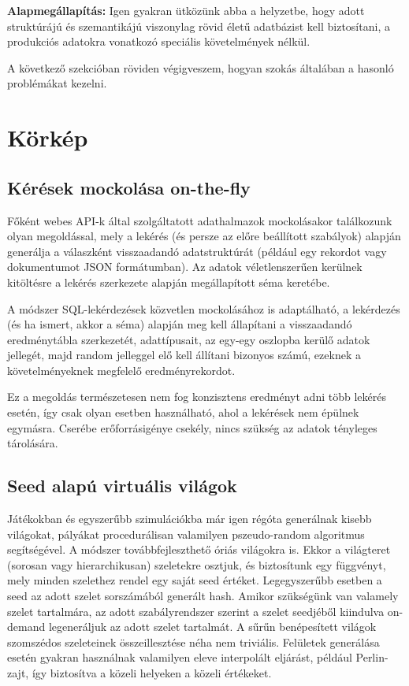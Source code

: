 \documentclass[
    parspace,
    noindent,
    nohyp,
]{elteiktdk}[2023/04/10]
\newcommand{\thesispar}[1]{
\vspace{1em}
\hspace{0.7cm}\parbox[left][][c]{15.8cm}{\linespread{1.2}\selectfont #1}
\vspace{1em}
}
\begin{document}
\thesispar{
    \textbf{Alapmegállapítás:} Igen gyakran ütközünk abba a helyzetbe, hogy adott struktúrájú és szemantikájú
    viszonylag rövid életű adatbázist kell biztosítani,
    a produkciós adatokra vonatkozó speciális követelmények nélkül.
}

A következő szekcióban röviden végigveszem, hogyan szokás általában a hasonló problémákat kezelni.

\section{Körkép}

\subsection{Kérések mockolása on-the-fly}

Főként webes API-k által szolgáltatott adathalmazok mockolásakor találkozunk olyan megoldással,
mely a lekérés (és persze az előre beállított szabályok)
alapján generálja a válaszként visszaadandó adatstruktúrát
(például egy rekordot vagy dokumentumot JSON formátumban).
Az adatok véletlenszerűen kerülnek kitöltésre a lekérés szerkezete alapján megállapított séma keretébe.

A módszer SQL-lekérdezések közvetlen mockolásához is adaptálható,
a lekérdezés (és ha ismert, akkor a séma) alapján meg kell állapítani
a visszaadandó eredménytábla szerkezetét, adattípusait,
az egy-egy oszlopba kerülő adatok jellegét,
majd random jelleggel elő kell állítani bizonyos számú, ezeknek a követelményeknek megfelelő eredményrekordot.

Ez a megoldás természetesen nem fog konzisztens eredményt adni több lekérés esetén,
így csak olyan esetben használható, ahol a lekérések nem épülnek egymásra.
Cserébe erőforrásigénye csekély, nincs szükség az adatok tényleges tárolására.

\subsection{Seed alapú virtuális világok}

Játékokban és egyszerűbb szimulációkba már igen régóta generálnak kisebb világokat,
pályákat procedurálisan valamilyen pszeudo-random algoritmus segítségével.
A módszer továbbfejleszthető óriás világokra is.
Ekkor a világteret (sorosan vagy hierarchikusan) szeletekre osztjuk, és biztosítunk egy függvényt,
mely minden szelethez rendel egy saját seed értéket.
Legegyszerűbb esetben a seed az adott szelet sorszámából generált hash.
Amikor szükségünk van valamely szelet tartalmára, az adott szabályrendszer szerint
a szelet seedjéből kiindulva on-demand legeneráljuk az adott szelet tartalmát.
A sűrűn benépesített világok szomszédos szeleteinek összeillesztése néha nem triviális.
Felületek generálása esetén gyakran használnak valamilyen eleve interpolált eljárást, például Perlin-zajt,
így biztosítva a közeli helyeken a közeli értékeket.
\end{document}
